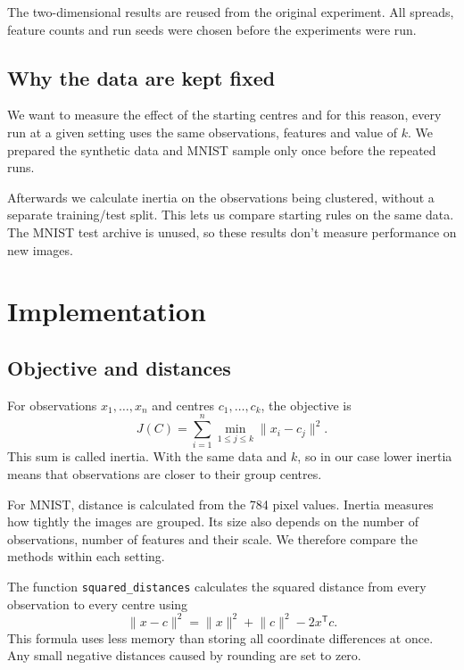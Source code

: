 \documentclass[11pt,a4paper]{article}
\begin{document}
The two-dimensional results are reused from the original experiment. All spreads, feature counts and run seeds were chosen before the experiments were run.

\subsection{Why the data are kept fixed}

We want to measure the effect of the starting centres and for this reason, every run at a given setting uses the same observations, features and value of $k$. We prepared the synthetic data and MNIST sample only once before the repeated runs.

Afterwards we calculate inertia on the observations being clustered, without a separate training/test split. This lets us compare starting rules on the same data. The MNIST test archive is unused, so these results don't measure performance on new images.

\section{Implementation}

\subsection{Objective and distances}

For observations $x_1,\ldots,x_n$ and centres $c_1,\ldots,c_k$, the objective is
\begin{equation}
J(C)=\sum_{i=1}^{n}\min_{1\leq j\leq k}\lVert x_i-c_j\rVert^2.
\label{eq:inertia}
\end{equation}
This sum is called inertia. With the same data and $k$, so in our case lower inertia means that observations are closer to their group centres.

For MNIST, distance is calculated from the 784 pixel values. Inertia measures how tightly the images are grouped. Its size also depends on the number of observations, number of features and their scale. We therefore compare the methods within each setting.

The function \texttt{squared\_distances} calculates the squared distance from every observation to every centre using
\[
\lVert x-c\rVert^2=\lVert x\rVert^2+\lVert c\rVert^2-2x^\mathsf{T}c.
\]
This formula uses less memory than storing all coordinate differences at once. Any small negative distances caused by rounding are set to zero.
\end{document}
